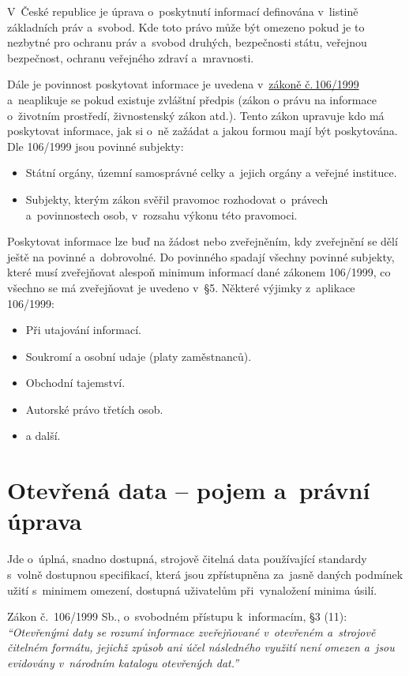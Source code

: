 V~České republice je úprava o~poskytnutí informací definována v~listině základních práv a~svobod. Kde toto právo může být omezeno pokud je to nezbytné pro ochranu práv a~svobod druhých, bezpečnosti státu, veřejnou bezpečnost, ochranu veřejného zdraví a~mravnosti. 

Dále je povinnost poskytovat informace je uvedena v~\href{https://www.zakonyprolidi.cz/cs/1999-106}{zákoně č.\,106/1999} a~neaplikuje se pokud existuje zvláštní předpis (zákon o právu na informace o~životním prostředí, živnostenský zákon atd.). Tento zákon upravuje kdo má poskytovat informace, jak si o~ně zažádat a jakou formou mají být poskytována. Dle 106/1999 jsou povinné subjekty:
\begin{itemize}[noitemsep]
    \item Státní orgány, územní samosprávné celky a~jejich orgány a veřejné instituce.
    \item Subjekty, kterým zákon svěřil pravomoc rozhodovat o~právech a~povinnostech osob, v~rozsahu výkonu této pravomoci.
\end{itemize}

Poskytovat informace lze buď na žádost nebo zveřejněním, kdy zveřejnění se dělí ještě na povinné a~dobrovolné. Do povinného spadají všechny povinné subjekty, které musí zveřejňovat alespoň minimum informací dané zákonem 106/1999, co všechno se má zveřejňovat je uvedeno v~§5. Některé výjimky z~aplikace 106/1999:
\begin{itemize}[noitemsep]
    \item Při utajování informací.
    \item Soukromí a osobní udaje (platy zaměstnanců).
    \item Obchodní tajemství.
    \item Autorské právo třetích osob.
    \item a další.
\end{itemize}

\clearpage
\section{Otevřená data -- pojem a~právní úprava}

Jde o~úplná, snadno dostupná, strojově čitelná data používající standardy s~volně dostupnou specifikací, která jsou zpřístupněna za~jasně daných podmínek užití s~minimem omezení, dostupná uživatelům při~vynaložení minima úsilí.

Zákon č.~106/1999 Sb., o~svobodném přístupu k~informacím, §3 (11): \emph{\enquote{Otevřenými daty se rozumí informace zveřejňované v~otevřeném a~strojově čitelném formátu, jejichž způsob ani účel následného využití není omezen a~jsou evidovány v~národním katalogu otevřených dat.}}


